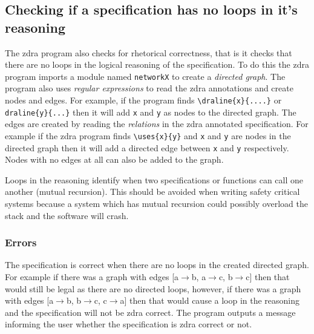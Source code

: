 \subsection{Checking if a specification has no loops in it's reasoning}
\label{subsec:loops}

The \gls{zdra} program also checks for rhetorical correctness, that is it checks
that there are no loops in the logical reasoning of the specification. To do
this the \gls{zdra} program imports a module named \texttt{networkX} to create a
\emph{directed graph}. The program also uses \emph{regular expressions} to read
the \gls{zdra} annotations and create nodes and edges. For example, if the
program finds \verb|\draline{x}{....}| or \verb|draline{y}{...}| then it will
add \texttt{x} and \texttt{y} as nodes to the directed graph. The edges are
created by reading the \emph{relations} in the \gls{zdra} annotated
specification. For example if the \gls{zdra} program finds \verb|\uses{x}{y}|
and \texttt{x} and \texttt{y} are nodes in the directed graph then it will add a
directed edge between \texttt{x} and \texttt{y} respectively. Nodes with no
edges at all can also be added to the graph.

Loops in the reasoning identify when two specifications or functions can call
one another (mutual recursion). This should be avoided when writing safety critical systems because
a system which has mutual recursion could possibly overload the stack and the
software will crash.

\subsubsection{Errors}
\label{subsubsec:zdra_looperrors}

The specification is correct when there are no loops in the created directed
graph. For example if there was a graph with edges [a$\rightarrow$b,
a$\rightarrow$c, b$\rightarrow$c] then that would still be legal as there are no
directed loops, however, if there was a graph with edges [a$\rightarrow$b,
b$\rightarrow$c, c$\rightarrow$a] then that would cause a loop in the reasoning
and the specification will not be \gls{zdra} correct. The program outputs a
message informing the user whether the specification is \gls{zdra} correct or
not.

